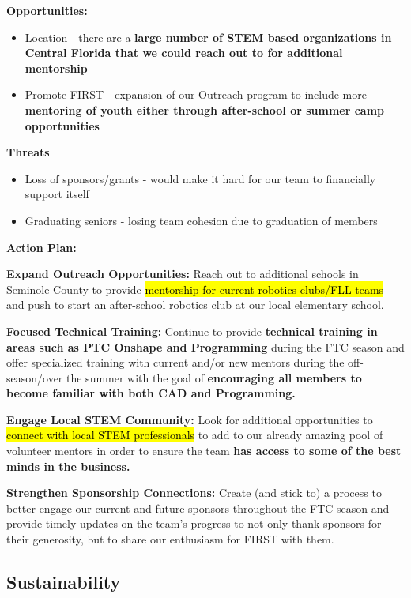 \textbf{Opportunities:} 
\begin{itemize}
\item Location - there are a \textbf{large number of STEM based organizations in Central Florida that we could reach out to for additional mentorship}
\item Promote FIRST - expansion of our Outreach program to include more \textbf{mentoring of youth either through after-school or summer camp opportunities}
\end{itemize}

	\textbf{Threats}
\begin{itemize}
 \item Loss of sponsors/grants - would make it hard for our team to financially support itself
 \item Graduating seniors - losing team cohesion due to graduation of members
\end{itemize}

\textbf{\Large Action Plan:}

\textbf{Expand Outreach Opportunities:} Reach out to additional schools in Seminole County to provide \hl{mentorship for current robotics clubs/FLL teams} and push to start an after-school robotics club at our local elementary school.

\textbf{Focused Technical Training:} Continue to provide \textbf{technical training in areas such as PTC Onshape and Programming} during the FTC season and offer specialized training with current and/or new mentors during the off-season/over the summer with the goal of \textbf{encouraging all members to become familiar with both CAD and Programming.}

\textbf{Engage Local STEM Community:} Look for additional opportunities to \hl{connect with local STEM professionals} to add to our already amazing pool of volunteer mentors in order to ensure the team \textbf{has access to some of the best minds in the business.}

\textbf{Strengthen Sponsorship Connections:} Create (and stick to) a process to better engage our current and future sponsors throughout the FTC season and provide timely updates on the team’s progress to not only thank sponsors for their generosity, but to share our enthusiasm for FIRST with them.

\subsection*{\textbf{\Huge Sustainability}}

